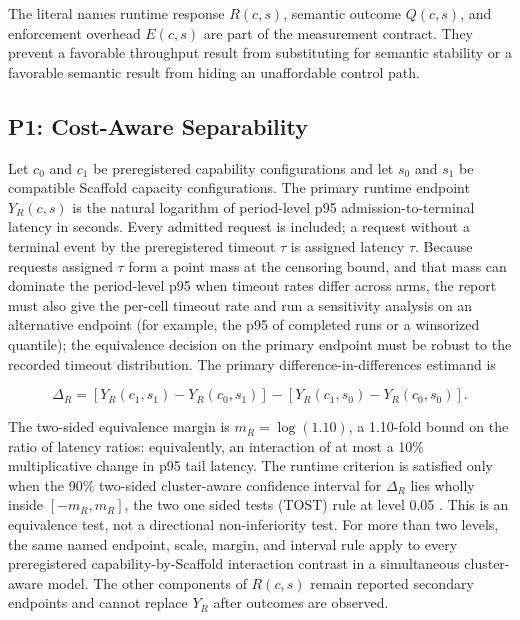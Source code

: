 \documentclass[11pt]{article}
\begin{document}
The literal names runtime response $R(c,s)$, semantic outcome $Q(c,s)$, and enforcement overhead $E(c,s)$ are part of the measurement contract. They prevent a favorable throughput result from substituting for semantic stability or a favorable semantic result from hiding an unaffordable control path.

\subsection{P1: Cost-Aware Separability}
\label{sec:p1}

Let $c_0$ and $c_1$ be preregistered capability configurations and let $s_0$ and $s_1$ be compatible Scaffold capacity configurations. The primary runtime endpoint $Y_R(c,s)$ is the natural logarithm of period-level p95 admission-to-terminal latency in seconds. Every admitted request is included; a request without a terminal event by the preregistered timeout $\tau$ is assigned latency $\tau$. Because requests assigned $\tau$ form a point mass at the censoring bound, and that mass can dominate the period-level p95 when timeout rates differ across arms, the report must also give the per-cell timeout rate and run a sensitivity analysis on an alternative endpoint (for example, the p95 of completed runs or a winsorized quantile); the equivalence decision on the primary endpoint must be robust to the recorded timeout distribution. The primary difference-in-differences estimand is

\begin{equation}
\Delta_R =
[Y_R(c_1,s_1)-Y_R(c_0,s_1)]
-[Y_R(c_1,s_0)-Y_R(c_0,s_0)].
\end{equation}

The two-sided equivalence margin is $m_R=\log(1.10)$, a 1.10-fold bound on the ratio of latency ratios: equivalently, an interaction of at most a 10\% multiplicative change in p95 tail latency. The runtime criterion is satisfied only when the 90\% two-sided cluster-aware confidence interval for $\Delta_R$ lies wholly inside $[-m_R,m_R]$, the two one sided tests (TOST) rule at level 0.05 \cite{schuirmann1987tost}. This is an equivalence test, not a directional non-inferiority test. For more than two levels, the same named endpoint, scale, margin, and interval rule apply to every preregistered capability-by-Scaffold interaction contrast in a simultaneous cluster-aware model. The other components of $R(c,s)$ remain reported secondary endpoints and cannot replace $Y_R$ after outcomes are observed.
\end{document}
